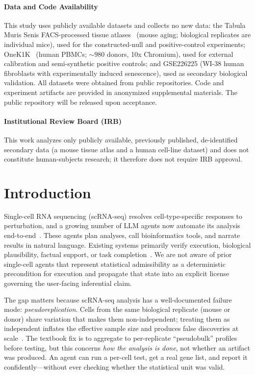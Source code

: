 \documentclass[pmlr,twocolumn,10pt]{jmlr}
\begin{document}
\paragraph*{Data and Code Availability}
This study uses publicly available datasets and collects no new data: the
Tabula Muris Senis FACS-processed tissue atlases~\citep{tabulamuris2020} (mouse
aging; biological replicates are individual mice), used for the
constructed-null and positive-control experiments; OneK1K~\citep{yazar2022}
(human PBMCs; ${\sim}980$ donors, 10x Chromium), used for external
calibration and semi-synthetic positive controls; and GSE226225
(WI-38 human fibroblasts with experimentally induced senescence), used as
secondary biological validation. All datasets were obtained from public
repositories. Code and experiment artifacts are provided in anonymized
supplemental materials. The public repository will be released upon acceptance.

\paragraph*{Institutional Review Board (IRB)}
This work analyzes only publicly available, previously published, de-identified
secondary data (a mouse tissue atlas and a human cell-line dataset) and does not
constitute human-subjects research; it therefore does not require IRB approval.

\section{Introduction}
\label{sec:intro}

Single-cell RNA sequencing (scRNA-seq) resolves cell-type-specific responses to
perturbation, and a growing number of LLM agents now automate its analysis
end-to-end~\citep{xiao2024cellagent,scpilot2026,biomni2025}. These agents plan
analyses, call bioinformatics tools, and narrate results in natural language.
Existing systems primarily verify execution, biological plausibility, factual
support, or task completion~\citep{geneagent2025,scagentbench2026}. We are not
aware of prior single-cell agents that represent statistical admissibility as a
deterministic precondition for execution and propagate that state into an
explicit license governing the user-facing inferential claim.

The gap matters because scRNA-seq analysis has a well-documented failure mode: \textit{pseudoreplication}. Cells from the same biological replicate (mouse or donor) share variation that makes them non-independent; treating them as independent inflates the effective sample size and produces false discoveries at scale~\citep{squair2021,zimmerman2021}. The textbook fix is to aggregate to per-replicate ``pseudobulk'' profiles before testing, but this concerns \textit{how the analysis is done}, not whether an artifact was produced. An agent can run a per-cell test, get a real gene list, and report it confidently---without ever checking whether the statistical unit was valid.
\end{document}

